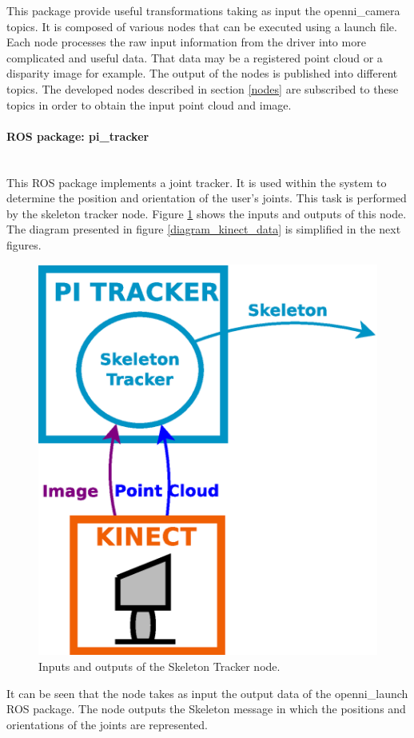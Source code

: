 This package provide useful transformations taking as input the openni\_camera topics. %
It is composed of various nodes that can be executed using a launch file. 
Each node processes the raw input information from the driver into more complicated and useful data. 
That data may be a registered point cloud or a disparity image for example. 
The output of the nodes is published into different topics. 
The developed nodes described in section \ref{nodes} are subscribed to these topics in order to obtain the input point cloud and image. 



\paragraph{ROS package: pi\_tracker}\mbox{}\\

This ROS package implements a joint tracker.
It is used within the system to determine the position and orientation of the user's joints. 
This task is performed by the skeleton tracker node.  
Figure \ref{diagram_skeleton} shows the inputs and outputs of this node. 
The diagram presented in figure \ref{diagram_kinect_data} is simplified in the next figures.  

		\begin{figure}[H]
			\begin{center}
			\includegraphics[width=0.3\linewidth]{img/diagrams/node_pi_tracker.eps}
			\caption[Skeleton Tracker I/O]{Inputs and outputs of the Skeleton Tracker node.}
			\label{diagram_skeleton}
			\end{center}
		\end{figure}

It can be seen that the node takes as input the output data of the openni\_launch ROS package. 
The node outputs the Skeleton message in which the positions and orientations of the joints are represented. 



